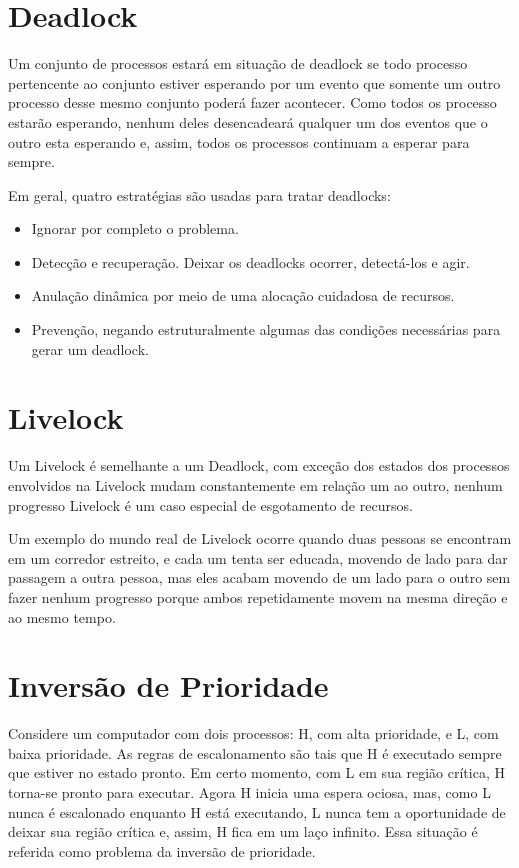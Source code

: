 \section{Deadlock}

Um conjunto de processos estará em situação de deadlock se todo processo pertencente ao conjunto estiver esperando por um evento que somente um outro processo desse mesmo conjunto poderá fazer acontecer. Como todos os processo estarão esperando, nenhum deles desencadeará qualquer um dos eventos que o outro esta esperando e, assim, todos os processos continuam a esperar para sempre.

Em geral, quatro estratégias são usadas para tratar deadlocks:

\begin{itemize}
\item Ignorar por completo o problema.
\item Detecção e recuperação. Deixar os deadlocks ocorrer, detectá-los e agir.
\item Anulação dinâmica por meio de uma alocação cuidadosa de recursos.
\item Prevenção, negando estruturalmente algumas das condições necessárias para gerar um deadlock.
\end{itemize}

\section{Livelock}

Um Livelock é semelhante a um Deadlock, com exceção dos estados dos processos envolvidos na Livelock mudam constantemente em relação um ao outro, nenhum progresso Livelock é um caso especial de esgotamento de recursos.

Um exemplo do mundo real de Livelock ocorre quando duas pessoas se encontram em um corredor estreito, e cada um tenta ser educada, movendo de lado para  dar passagem a outra pessoa, mas eles acabam movendo de um lado para o outro sem fazer nenhum progresso porque ambos repetidamente movem na mesma direção e ao mesmo tempo.

\section{Inversão de Prioridade}

Considere um computador com dois processos: H, com alta prioridade, e L, com baixa prioridade. As regras de escalonamento são tais que H é executado sempre que estiver no estado pronto. Em certo momento, com L em sua região crítica, H torna-se pronto para executar. Agora H inicia uma espera ociosa, mas, como L nunca é escalonado enquanto H está executando, L nunca tem a oportunidade de deixar sua região crítica e, assim, H fica em um laço infinito. Essa situação é referida como problema da inversão de prioridade.

